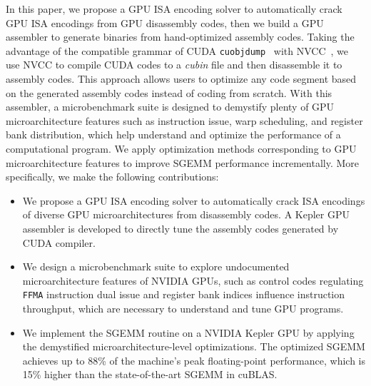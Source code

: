 In this paper, we propose a GPU ISA encoding solver to automatically crack GPU ISA encodings from GPU disassembly codes,
then we build a GPU assembler to generate binaries from hand-optimized assembly codes.%
Taking the advantage of the compatible grammar of CUDA {\tt cuobjdump}~\cite{cubin2015util} with NVCC~\cite{nvcc}, we use NVCC to compile CUDA codes to a {\em cubin} file and 
then disassemble it to assembly codes. 
This approach allows users to optimize any code segment based on the generated assembly codes instead of coding from scratch. 
With this assembler, a microbenchmark suite is designed to 
demystify plenty of GPU microarchitecture features such as instruction issue, warp scheduling, and register bank distribution, which help understand and optimize the performance of a computational program. 
We apply optimization methods corresponding to GPU microarchitecture features to improve SGEMM performance incrementally. 
More specifically, we make the following contributions:
\begin{itemize}
\item We propose a GPU ISA encoding solver to automatically crack ISA encodings
     of diverse GPU microarchitectures from disassembly codes.
A Kepler GPU assembler is developed to directly tune the assembly codes generated by CUDA compiler.
\item We design a microbenchmark suite to explore undocumented
microarchitecture features of NVIDIA GPUs, such as control codes regulating
{\tt FFMA} instruction dual issue and register bank indices influence
instruction throughput, which are necessary to understand and tune GPU
programs.
\item We implement the SGEMM routine on a NVIDIA Kepler GPU by applying the demystified microarchitecture-level optimizations. 
The optimized SGEMM achieves up to 88\% of the machine's peak floating-point performance, which is 15\% higher than the state-of-the-art SGEMM in cuBLAS.
\end{itemize}

